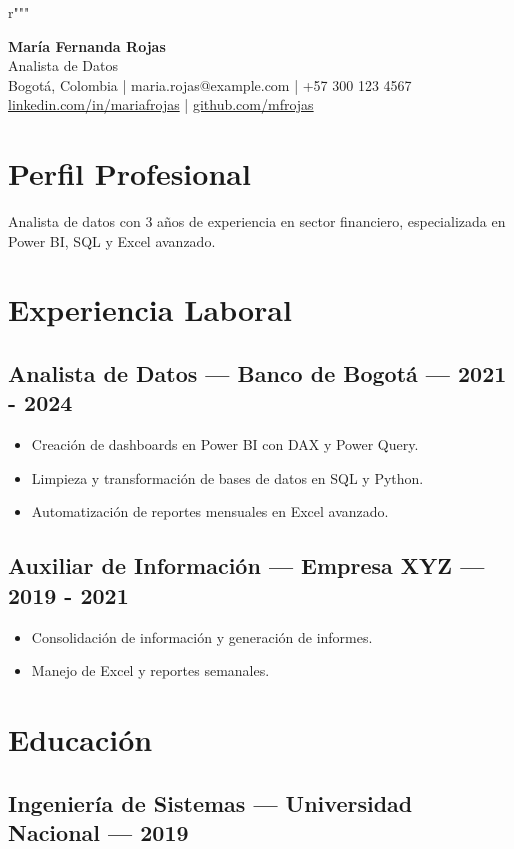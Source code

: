 r"""\documentclass[11pt,a4paper]{article}
\begin{document}
\begin{center}
{\Large \textbf{María Fernanda Rojas}} \\
Analista de Datos \\
Bogotá, Colombia | maria.rojas@example.com | +57 300 123 4567 \\
\href{https://linkedin.com/in/mariafrojas}{linkedin.com/in/mariafrojas} |
\href{https://github.com/mfrojas}{github.com/mfrojas}
\end{center}

\section*{Perfil Profesional}
Analista de datos con 3 años de experiencia en sector financiero,
especializada en Power BI, SQL y Excel avanzado.

\section*{Experiencia Laboral}
\subsection*{Analista de Datos — Banco de Bogotá — 2021 - 2024}
\begin{itemize}
\item Creación de dashboards en Power BI con DAX y Power Query.
\item Limpieza y transformación de bases de datos en SQL y Python.
\item Automatización de reportes mensuales en Excel avanzado.
\end{itemize}
\subsection*{Auxiliar de Información — Empresa XYZ — 2019 - 2021}
\begin{itemize}
\item Consolidación de información y generación de informes.
\item Manejo de Excel y reportes semanales.
\end{itemize}

\section*{Educación}
\subsection*{Ingeniería de Sistemas — Universidad Nacional — 2019}
\end{document}
